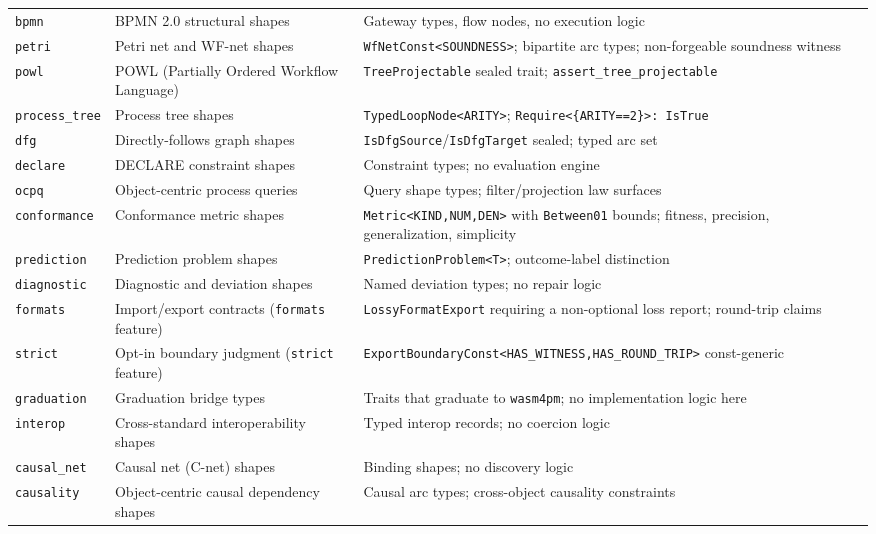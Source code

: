 \begin{longtable}{@{}lp{4.8cm}p{5.0cm}@{}}
\texttt{bpmn}           & BPMN 2.0 structural shapes & Gateway types, flow nodes, no execution logic \\
\texttt{petri}          & Petri net and WF-net shapes & \texttt{WfNetConst<SOUNDNESS>}; bipartite arc types; non-forgeable soundness witness \\
\texttt{powl}           & POWL (Partially Ordered Workflow Language) & \texttt{TreeProjectable} sealed trait; \texttt{assert\_tree\_projectable} \\
\texttt{process\_tree}  & Process tree shapes & \texttt{TypedLoopNode<ARITY>}; \texttt{Require<\{ARITY==2\}>: IsTrue} \\
\texttt{dfg}            & Directly-follows graph shapes & \texttt{IsDfgSource}/\texttt{IsDfgTarget} sealed; typed arc set \\
\texttt{declare}        & DECLARE constraint shapes & Constraint types; no evaluation engine \\
\texttt{ocpq}           & Object-centric process queries & Query shape types; filter/projection law surfaces \\
\texttt{conformance}    & Conformance metric shapes & \texttt{Metric<KIND,NUM,DEN>} with \texttt{Between01} bounds; fitness, precision, generalization, simplicity \\
\texttt{prediction}     & Prediction problem shapes & \texttt{PredictionProblem<T>}; outcome-label distinction \\
\texttt{diagnostic}     & Diagnostic and deviation shapes & Named deviation types; no repair logic \\
\texttt{formats}        & Import/export contracts (\texttt{formats} feature) & \texttt{LossyFormatExport} requiring a non-optional loss report; round-trip claims \\
\texttt{strict}         & Opt-in boundary judgment (\texttt{strict} feature) & \texttt{ExportBoundaryConst<HAS\_WITNESS,HAS\_ROUND\_TRIP>} const-generic \\
\texttt{graduation}     & Graduation bridge types & Traits that graduate to \texttt{wasm4pm}; no implementation logic here \\
\texttt{interop}        & Cross-standard interoperability shapes & Typed interop records; no coercion logic \\
\texttt{causal\_net}    & Causal net (C-net) shapes & Binding shapes; no discovery logic \\
\texttt{causality}      & Object-centric causal dependency shapes & Causal arc types; cross-object causality constraints \\

\end{longtable}
